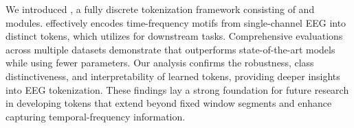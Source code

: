 We introduced \method, a fully discrete tokenization framework consisting of \tokenizer and \encoder modules. \tokenizer effectively encodes time-frequency motifs from single-channel EEG into distinct tokens, which \encoder utilizes for downstream tasks. Comprehensive evaluations across multiple datasets demonstrate that \method outperforms state-of-the-art models while using fewer parameters. Our analysis confirms the robustness, class distinctiveness, and interpretability of learned tokens, providing deeper insights into EEG tokenization. 
These findings lay a strong foundation for future research in developing tokens that extend beyond fixed window segments and enhance capturing temporal-frequency information.





